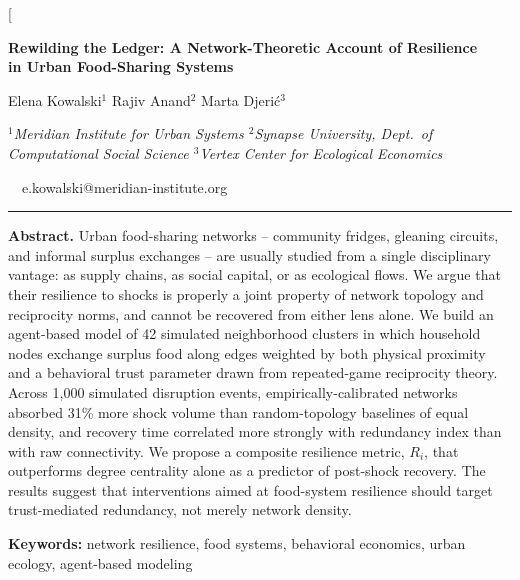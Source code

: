 \documentclass[10pt,twocolumn]{article}
\begin{document}
\twocolumn[
\begin{center}
  {\color{inkblue}\fontsize{19}{23}\selectfont\bfseries
   Rewilding the Ledger: A Network-Theoretic Account of Resilience\\ in Urban Food-Sharing Systems\par}
  \vspace{8pt}
  {\normalsize Elena Kowalski$^{1}$ \quad Rajiv Anand$^{2}$ \quad Marta Djeri\'{c}$^{3}$\par}
  \vspace{4pt}
  {\small\itshape
   $^{1}$Meridian Institute for Urban Systems \quad
   $^{2}$Synapse University, Dept.\ of Computational Social Science \quad
   $^{3}$Vertex Center for Ecological Economics\par}
  \vspace{3pt}
  {\small \faEnvelope\ \ e.kowalski@meridian-institute.org
   \quad{}\par}
  \vspace{6pt}
  {\color{claygold}\rule{0.55\textwidth}{0.8pt}\par}
\end{center}
\vspace{6pt}

\begin{abstractbox}
\textbf{\color{inkblue}Abstract.}
Urban food-sharing networks -- community fridges, gleaning circuits, and informal
surplus exchanges -- are usually studied from a single disciplinary vantage: as
supply chains, as social capital, or as ecological flows. We argue that their
resilience to shocks is properly a joint property of network topology and
reciprocity norms, and cannot be recovered from either lens alone. We build an
agent-based model of 42 simulated neighborhood clusters in which household
nodes exchange surplus food along edges weighted by both physical proximity
and a behavioral trust parameter drawn from repeated-game reciprocity theory.
Across 1{,}000 simulated disruption events, empirically-calibrated networks
absorbed 31\% more shock volume than random-topology baselines of equal
density, and recovery time correlated more strongly with redundancy index
than with raw connectivity. We propose a composite resilience metric,
$R_i$, that outperforms degree centrality alone as a predictor of
post-shock recovery. The results suggest that interventions aimed at
food-system resilience should target trust-mediated redundancy, not merely
network density.
\vspace{3pt}

\textbf{\color{inkblue}Keywords:} network resilience, food systems,
behavioral economics, urban ecology, agent-based modeling
\end{abstractbox}
\end{document}
